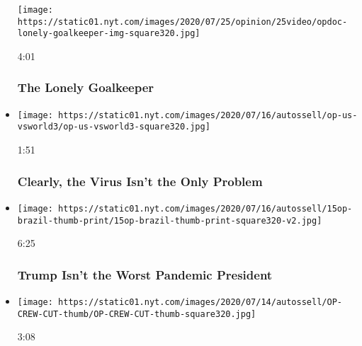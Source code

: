 \begin{itemize}
  \texttt{[image: https://static01.nyt.com/images/2020/07/25/opinion/25video/opdoc-lonely-goalkeeper-img-square320.jpg]}

  4:01

  \hypertarget{the-lonely-goalkeeper}{%
  \subsubsection{The Lonely Goalkeeper}\label{the-lonely-goalkeeper}}
\item
  \href{https://www.nytimes.com/video/opinion/100000007242791/coronavirus-response-america.html?action=click\&module=video-series-bar\&region=header\&pgtype=Article\&playlistId=video/opinion}{}

  \texttt{[image: https://static01.nyt.com/images/2020/07/16/autossell/op-us-vsworld3/op-us-vsworld3-square320.jpg]}

  1:51

  \hypertarget{clearly-the-virus-isnt-the-only-problem}{%
  \subsubsection{Clearly, the Virus Isn't the Only
  Problem}\label{clearly-the-virus-isnt-the-only-problem}}
\item
  \href{https://www.nytimes.com/video/opinion/100000007227771/coronavirus-covid-brazil-bolsonaro.html?action=click\&module=video-series-bar\&region=header\&pgtype=Article\&playlistId=video/opinion}{}

  \texttt{[image: https://static01.nyt.com/images/2020/07/16/autossell/15op-brazil-thumb-print/15op-brazil-thumb-print-square320-v2.jpg]}

  6:25

  \hypertarget{trump-isnt-the-worst-pandemic-president}{%
  \subsubsection{Trump Isn't the Worst Pandemic
  President}\label{trump-isnt-the-worst-pandemic-president}}
\item
  \href{https://www.nytimes.com/video/opinion/100000007227752/hollywood-latinos-diversity.html?action=click\&module=video-series-bar\&region=header\&pgtype=Article\&playlistId=video/opinion}{}

  \texttt{[image: https://static01.nyt.com/images/2020/07/14/autossell/OP-CREW-CUT-thumb/OP-CREW-CUT-thumb-square320.jpg]}

  3:08


\end{itemize}
